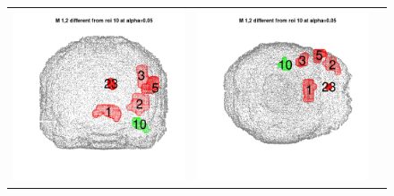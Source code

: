 \documentclass[12pt]{article}
\begin{document}
\begin{figure}[h]
\begin{tabular}{ccc}
\includegraphics[scale = 0.24]{../a7plots/d_2r_10_view2.png} & 
\includegraphics[scale = 0.24]{../a7plots/d_2r_10_view3.png} \\ 

\end{tabular}
\end{figure}
\end{document}
